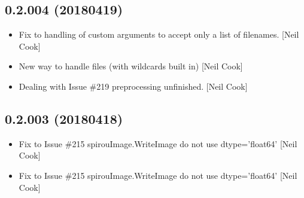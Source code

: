 \documentclass[a4paper,10pt,english]{report}
\begin{document}
\subsection{0.2.004 (2018\sphinxhyphen{}04\sphinxhyphen{}19)}
\label{\detokenize{misc/changelog:id477}}\begin{itemize}
\item {} 
Fix to handling of custom arguments to accept only a list of
filenames. {[}Neil Cook{]}

\item {} 
New way to handle files (with wildcards built in) {[}Neil Cook{]}

\item {} 
Dealing with Issue \#219 \sphinxhyphen{} pre\sphinxhyphen{}processing \sphinxhyphen{} unfinished. {[}Neil Cook{]}

\end{itemize}


\subsection{0.2.003 (2018\sphinxhyphen{}04\sphinxhyphen{}18)}
\label{\detokenize{misc/changelog:id478}}\begin{itemize}
\item {} 
Fix to Issue \#215 \sphinxhyphen{} spirouImage.WriteImage do not use dtype=’float64’
{[}Neil Cook{]}

\item {} 
Fix to Issue \#215 \sphinxhyphen{} spirouImage.WriteImage do not use dtype=’float64’
{[}Neil Cook{]}

\end{itemize}
\end{document}
